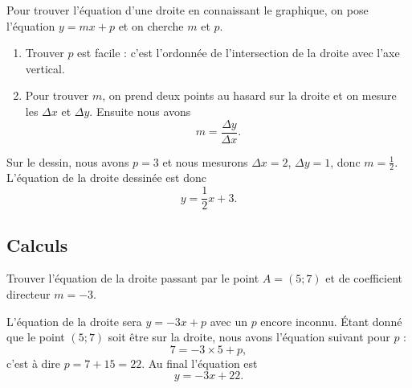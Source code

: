 \begin{minipage}{0.485\textwidth}
Pour trouver l'équation d'une droite en connaissant le graphique, on pose l'équation \( y=mx+p\) et on cherche \( m\) et \( p\).
\begin{enumerate}
    \item
        Trouver \( p\) est facile : c'est l'ordonnée de l'intersection de la droite avec l'axe vertical.
    \item
        Pour trouver \( m\), on prend deux points au hasard sur la droite et on mesure les \( \Delta x\) et \( \Delta y\). Ensuite nous avons
        \begin{equation}
            m=\frac{ \Delta y }{ \Delta x }.
        \end{equation}
\end{enumerate}
\end{minipage}
\hspace{1mm}
\begin{minipage}{0.485\textwidth}
\begin{center}

\end{center}
\end{minipage}


Sur le dessin, nous avons \( p=3\) et nous mesurons \( \Delta x=2\), \( \Delta y=1\), donc \( m=\frac{ 1 }{2}\). L'équation de la droite dessinée est donc
\begin{equation}
    y=\frac{ 1 }{2}x+3.
\end{equation}

\subsection{Calculs}

\begin{example}
    Trouver l'équation de la droite passant par le point \( A=(5;7)\) et de coefficient directeur \( m=-3\). 

    L'équation de la droite sera \( y=-3x+p\) avec un \( p\) encore inconnu. Étant donné que le point \( (5;7)\) soit être sur la droite, nous avons l'équation suivant pour \( p\) :
    \begin{equation}
        7=-3\times 5+p,
    \end{equation}
    c'est à dire \( p=7+15=22\). Au final l'équation est
    \begin{equation}
        y=-3x+22.
    \end{equation}
\end{example}

